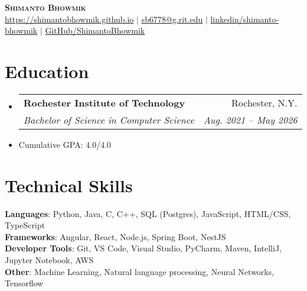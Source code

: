 \documentclass[letterpaper,11pt]{article}
\makeatletter
\newcommand{\resumeItem}[1]{
  \item\small{
    {#1 \vspace{-2pt}}
  }
}
\newcommand{\resumeSubheading}[4]{
  \vspace{-2pt}\item
    \begin{tabular*}{0.97\textwidth}[t]{l@{\extracolsep{\fill}}r}
      \textbf{#1} & #2 \\
      \textit{\small#3} & \textit{\small #4} \\
    \end{tabular*}\vspace{-7pt}
}
\newcommand{\resumeSubHeadingListStart}{\begin{itemize}[leftmargin=0.15in, label={}]}
\newcommand{\resumeSubHeadingListEnd}{\end{itemize}}
\makeatother
\begin{document}

\begin{center}
    \textbf{\Huge \scshape Shimanto Bhowmik} \\ \vspace{1pt}
    \href{https://shimantobhowmik.github.io}{\small{https://shimantobhowmik.github.io}} $|$ 
    \href{mailto:sb6778@g.rit.edu}{\small{sb6778@g.rit.edu}} $|$ 
    \href{https://www.linkedin.com/in/shimantobhowmik/}{\small{linkedin/shimanto-bhowmik}} $|$ 
    \href{https://github.com/ShimantoBhowmik}{\small{GitHub/ShimantoBhowmik}}
\end{center}




\section{Education}
\resumeSubHeadingListStart
\resumeSubheading
{Rochester Institute of Technology}{Rochester, N.Y.}
{Bachelor of Science in Computer Science}{Aug. 2021 -- May 2026}
\resumeItem{Cumulative GPA: 4.0/4.0}
\resumeSubHeadingListEnd

%
\section{Technical Skills}
\begin{itemize}[leftmargin=0.15in, label={}]
    \small{\item{
        \textbf{Languages}{: Python, Java, C, C++, SQL (Postgres), JavaScript, HTML/CSS, TypeScript} \\
        \textbf{Frameworks}{: Angular, React, Node.js, Spring Boot, NestJS} \\
        \textbf{Developer Tools}{: Git, VS Code, Visual Studio, PyCharm, Maven, IntelliJ, Jupyter Notebook, AWS} \\
        \textbf{Other}{: Machine Learning, Natural language processing, Neural Networks, Tensorflow}
    }}
\end{itemize}
\vfill
\end{document}
